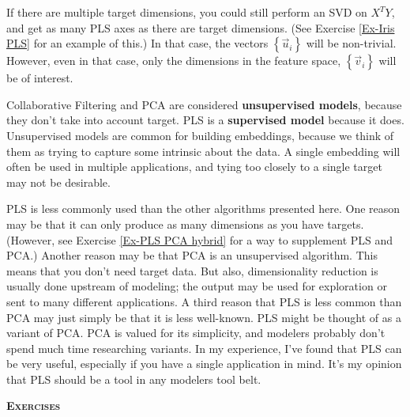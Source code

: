 \documentclass{amsbook}
\begin{document}
If there are multiple target dimensions, you could still perform an SVD on $X^TY$, and get as many PLS axes as there are target dimensions.  (See Exercise \ref{Ex-Iris PLS} for an example of this.)  In that case, the vectors $\left\{\vec u_i\right\}$ will be non-trivial.  However, even in that case, only the dimensions in the feature space, $\left\{\vec v_i\right\}$ will be of interest.

Collaborative Filtering and PCA are considered {\bf unsupervised models}, because they don't take into account target.  PLS is a {\bf supervised model} because it does.  Unsupervised models are common for building embeddings, because we think of them as trying to capture some intrinsic about the data.  A single embedding will often be used in multiple applications, and tying too closely to a single target may not be desirable.

PLS is less commonly used than the other algorithms presented here.  One reason may be that it can only produce as many dimensions as you have targets.  (However, see Exercise \ref{Ex-PLS PCA hybrid} for a way to supplement PLS and PCA.)  Another reason may be that PCA is an unsupervised algorithm.  This means that you don't need target data.  But also, dimensionality reduction is usually done upstream of modeling; the output may be used for exploration or sent to many different applications.  A third reason that PLS is less common than PCA may just simply be that it is less well-known.  PLS might be thought of as a variant of PCA.  PCA is valued for its simplicity, and modelers probably don't spend much time researching variants.  In my experience, I've found that PLS can be very useful, especially if you have a single application in mind.  It's my opinion that PLS should be a tool in any modelers tool belt.

{\bfseries\scshape\Large Exercises}
\end{document}
